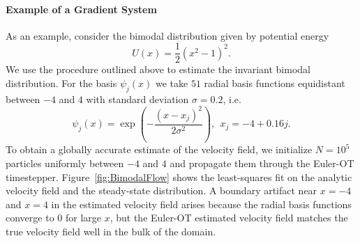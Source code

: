 \documentclass{article}
\begin{document}
\paragraph{Example of a Gradient System} As an example, consider the bimodal distribution given by potential energy
\begin{equation}
    U(x) = \frac{1}{2}\left(x^2 - 1\right)^2.
\end{equation}
We use the procedure outlined above to estimate the invariant bimodal distribution. For the basis $\psi_j(x)$ we take $51$ radial basis functions equidistant between $-4$ and $4$ with standard deviation $\sigma = 0.2$, i.e.
\begin{equation}
    \psi_j(x) = \exp\left(-\frac{(x - x_j)^2}{2 \sigma^2}\right), \ \ x_j = -4 + 0.16 j.
\end{equation}
To obtain a globally accurate estimate of the velocity field, we initialize $N=10^5$ particles uniformly between $-4$ and $4$ and propagate them through the Euler-OT timestepper. Figure~\ref{fig:BimodalFlow} shows the least-squares fit on the analytic velocity field and the steady-state distribution. A boundary artifact near $x=-4$ and $x=4$ in the estimated velocity field arises because the radial basis functions converge to $0$ for large $x$, but the Euler-OT estimated velocity field matches the true velocity field well in the bulk of the domain.
\end{document}
